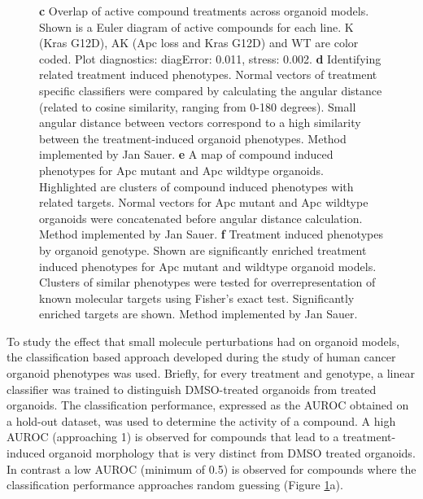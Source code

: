 \begin{flushleft}
\begin{figure}[h]
{\textbf{c} Overlap of active compound treatments across organoid models. Shown is a Euler diagram of active compounds for each line. K (Kras G12D), AK (Apc loss and Kras G12D) and WT are color coded. Plot diagnostics: diagError: 0.011, stress: 0.002.
\textbf{d} Identifying related treatment induced phenotypes. Normal vectors of treatment specific classifiers were compared by calculating the angular distance (related to cosine similarity, ranging from 0-180 degrees). Small angular distance between vectors correspond to a high similarity between the treatment-induced organoid phenotypes. Method implemented by Jan Sauer.
\textbf{e} A map of compound induced phenotypes for Apc mutant and Apc wildtype organoids. Highlighted are clusters of compound induced phenotypes with related targets. Normal vectors for Apc mutant and Apc wildtype organoids were concatenated before angular distance calculation. Method implemented by Jan Sauer.
\textbf{f} Treatment induced phenotypes by organoid genotype. Shown are significantly enriched treatment induced phenotypes for Apc mutant and wildtype organoid models. Clusters of similar phenotypes were tested for overrepresentation of known molecular targets using Fisher’s exact test. Significantly enriched targets are shown. Method implemented by Jan Sauer.
}
\label{fig_150}
\end{figure}
\bigbreak

To study the effect that small molecule perturbations had on organoid models, the classification based approach developed during the study of human cancer organoid phenotypes was used. Briefly, for every treatment and genotype, a linear classifier was trained to distinguish DMSO-treated organoids from treated organoids. The classification performance, expressed as the AUROC obtained on a hold-out dataset, was used to determine the activity of a compound. A high AUROC (approaching 1) is observed for compounds that lead to a treatment-induced organoid morphology that is very distinct from DMSO treated organoids. In contrast a low AUROC (minimum of 0.5) is observed for compounds where the classification performance approaches random guessing (Figure \ref{fig_150}a).


\end{flushleft}
